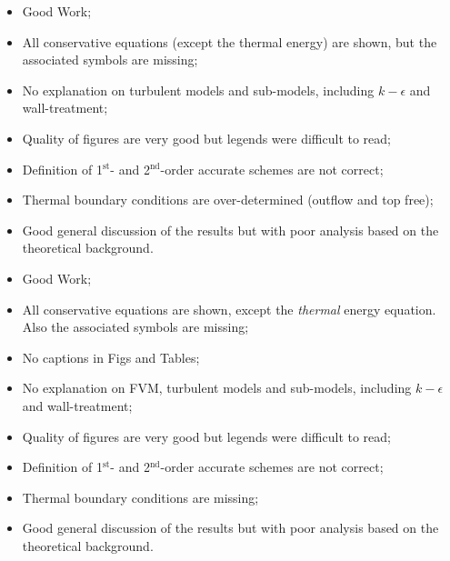 \documentclass[14pt,twoside]{report}
\begin{document}


\bigskip


\medskip

  \begin{itemize}
%
     \item Good Work;
     \item All conservative equations (except the thermal energy) are shown, but the associated symbols are missing;
     \item No explanation on turbulent models and sub-models, including $k-\epsilon$ and wall-treatment;%
     \item Quality of figures are very good but legends were difficult to read;
     \item Definition of 1$^{\text{st}}$- and 2$^{\text{nd}}$-order accurate schemes are not correct;
     \item Thermal boundary conditions are over-determined (outflow and top free);
     \item Good general discussion of the results but with poor analysis based on the theoretical background.
%
  \end{itemize}

\clearpage 





\bigskip


\medskip

  \begin{itemize}
%
     \item Good Work;
     \item All conservative equations are shown, except the {\it thermal} energy equation. Also the associated symbols are missing;
     \item No captions in Figs and Tables;
     \item No explanation on FVM, turbulent models and sub-models, including $k-\epsilon$ and wall-treatment;%
     \item Quality of figures are very good but legends were difficult to read;
     \item Definition of 1$^{\text{st}}$- and 2$^{\text{nd}}$-order accurate schemes are not correct;
     \item Thermal boundary conditions are missing;
     \item Good general discussion of the results but with poor analysis based on the theoretical background.
%
  \end{itemize}
\end{document}
